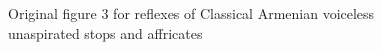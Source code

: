 \begin{figure}
	\centering
	\caption{Original figure 3 for reflexes of Classical Armenian voiceless unaspirated stops and affricates}
	\label{fig:fig3 original}
\end{figure}


